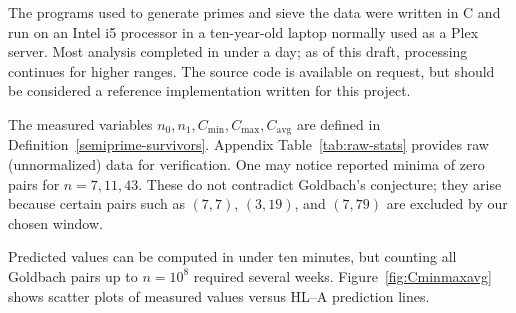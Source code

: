 \documentclass[11pt]{article}
\theoremstyle{inline}
\theoremstyle{break}
\theoremstyle{break}
\theoremstyle{break}
\theoremstyle{break}
\theoremstyle{break}
\theoremstyle{inline}
\newcommand{\tavg}{{\scriptscriptstyle\mathrm{avg}}}
\newcommand{\Cmeas}{C}              %
\newcommand{\Nmeas}{n}              %
\begin{document}
The programs used to generate primes and sieve the data were written in C and run on an Intel i5 processor in a ten-year-old laptop normally used as a Plex server. Most analysis completed in under a day; as of this draft, processing continues for higher ranges. The source code is available on request, but should be considered a reference implementation written for this project.

The measured variables \( \Nmeas_0, \Nmeas_1, \Cmeas_{\min}, \Cmeas_{\max}, \Cmeas_{\tavg} \) are defined in Definition~\ref{semiprime-survivors}. Appendix Table~\ref{tab:raw-stats} provides raw (unnormalized) data for verification. One may notice reported minima of zero pairs for \( n=7,11,43 \). These do not contradict Goldbach’s conjecture; they arise because certain pairs such as \( (7,7) \), \( (3,19) \), and \( (7,79) \) are excluded by our chosen window.

Predicted values can be computed in under ten minutes, but counting all Goldbach pairs up to \( n=10^8 \) required several weeks. Figure~\ref{fig:Cminmaxavg} shows scatter plots of measured values versus HL–A prediction lines.

\pairdata
\end{document}
